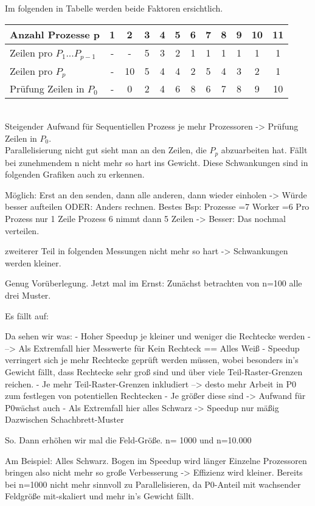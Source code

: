 \documentclass[
10pt, %
a4paper, %
oneside, %
headinclude,footinclude, %
BCOR5mm, %
]{scrartcl}
\begin{document}
Im folgenden in Tabelle werden beide Faktoren ersichtlich.\\

\begin{tabular}{l|c|c|c|c|c|c|c|c|c|c|c|}
\hline 
Anzahl Prozesse p & 1 & 2 & 3 & 4 & 5 & 6 & 7 & 8  & 9 &  10 & 11\\ 
\hline 
Zeilen pro \(P_1 ... P_{p-1}\) & - & - & 5 & 3 & 2 & 1 & 1 & 1  & 1 &  1 & 1\\
\hline 
Zeilen pro \(P_{p}\) & - & 10 & 5 & 4 & 4 & 2 & 5 & 4  & 3 &  2 & 1\\
\hline 
Prüfung Zeilen in \(P_{0}\) & - & 0 & 2 & 4 & 6 & 8 & 6 & 7  & 8 &  9 & 10\\
\hline 
\end{tabular}\\

 Steigender Aufwand für Sequentiellen Prozess je mehr Prozessoren -> Prüfung Zeilen in \(P_{0}\).\\
 Parallelisierung nicht gut sieht man an den Zeilen, die \(P_{p}\) abzuarbeiten hat. Fällt bei zunehmendem n nicht mehr so hart ins Gewicht. Diese Schwankungen sind in folgenden Grafiken auch zu erkennen.
 
 Möglich: Erst an den senden, dann alle anderen, dann wieder einholen -> Würde besser aufteilen
 ODER: Anders rechnen. Bestes Bsp:  Prozesse =7 Worker =6 Pro Prozess nur 1 Zeile Prozess 6 nimmt dann 5 Zeilen -> Besser: Das nochmal verteilen. 
 
 zweiterer Teil in folgenden Messungen nicht mehr so hart -> Schwankungen werden kleiner.
 
 
Genug Vorüberlegung. Jetzt mal im Ernst:
Zunächst betrachten von n=100 alle drei Muster.

Es fällt auf:
	
Da sehen wir was:
- Hoher Speedup je kleiner und weniger die Rechtecke werden
- --> Als Extremfall hier Messwerte für Kein Rechteck == Alles Weiß
- Speedup verringert sich je mehr Rechtecke geprüft werden müssen, wobei besonders in's Gewicht fällt, dass Rechtecke sehr groß sind und über viele Teil-Raster-Grenzen reichen.
- Je mehr Teil-Raster-Grenzen inkludiert --> desto mehr Arbeit in P0  zum festlegen von potentiellen Rechtecken
- Je größer diese sind -> Aufwand für P0wächst auch
- Als Extremfall hier alles Schwarz -> Speedup nur mäßig
Dazwischen Schachbrett-Muster 
 
 
 So. 
 Dann erhöhen wir mal die Feld-Größe.
 n= 1000 und n=10.000
 
 Am Beispiel: Alles Schwarz.
 Bogen im Speedup wird länger
 Einzelne Prozessoren bringen also nicht mehr so große Verbesserung -> Effizienz wird kleiner.
 Bereits bei n=1000 nicht mehr sinnvoll zu Parallelisieren, da P0-Anteil mit wachsender Feldgröße mit-skaliert und mehr in's Gewicht fällt.
 
\end{document}
